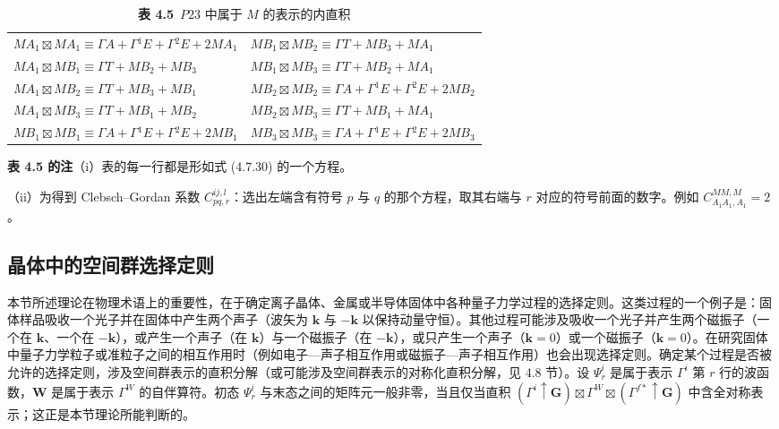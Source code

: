 \begin{table}[H]
\centering
\caption*{\textbf{表 4.5}\ $P23$ 中属于 $M$ 的表示的内直积}
\begin{tabular}{@{}ll@{}}
\toprule
$MA_{1} \boxtimes MA_{1} \equiv \Gamma A + \Gamma{}^{1}E + \Gamma{}^{2}E + 2MA_{1}$ & $MB_{1} \boxtimes MB_{2} \equiv \Gamma T + MB_{3} + MA_{1}$\\
$MA_{1} \boxtimes MB_{1} \equiv \Gamma T + MB_{2} + MB_{3}$ & $MB_{1} \boxtimes MB_{3} \equiv \Gamma T + MB_{2} + MA_{1}$\\
$MA_{1} \boxtimes MB_{2} \equiv \Gamma T + MB_{3} + MB_{1}$ & $MB_{2} \boxtimes MB_{2} \equiv \Gamma A + \Gamma{}^{1}E + \Gamma{}^{2}E + 2MB_{2}$\\
$MA_{1} \boxtimes MB_{3} \equiv \Gamma T + MB_{1} + MB_{2}$ & $MB_{2} \boxtimes MB_{3} \equiv \Gamma T + MB_{1} + MA_{1}$\\
$MB_{1} \boxtimes MB_{1} \equiv \Gamma A + \Gamma{}^{1}E + \Gamma{}^{2}E + 2MB_{1}$ & $MB_{3} \boxtimes MB_{3} \equiv \Gamma A + \Gamma{}^{1}E + \Gamma{}^{2}E + 2MB_{3}$\\
\bottomrule
\end{tabular}
\end{table}

\noindent\textbf{表 4.5 的注}\quad（i）表的每一行都是形如式 (4.7.30) 的一个方程。

（ii）为得到 Clebsch--Gordan 系数 $C^{ij, l}_{pq, r}$：选出左端含有符号 $p$ 与 $q$ 的那个方程，取其右端与 $r$ 对应的符号前面的数字。例如 $C^{MM, M}_{A_{1}A_{1}, A_{1}} = 2$。

\subsection*{晶体中的空间群选择定则}

本节所述理论在物理术语上的重要性，在于确定离子晶体、金属或半导体固体中各种量子力学过程的选择定则。这类过程的一个例子是：固体样品吸收一个光子并在固体中产生两个声子（波矢为 $\mathbf{k}$ 与 $-\mathbf{k}$ 以保持动量守恒）。其他过程可能涉及吸收一个光子并产生两个磁振子（一个在 $\mathbf{k}$、一个在 $-\mathbf{k}$），或产生一个声子（在 $\mathbf{k}$）与一个磁振子（在 $-\mathbf{k}$），或只产生一个声子（$\mathbf{k} = 0$）或一个磁振子（$\mathbf{k} = 0$）。在研究固体中量子力学粒子或准粒子之间的相互作用时（例如电子—声子相互作用或磁振子—声子相互作用）也会出现选择定则。确定某个过程是否被允许的选择定则，涉及空间群表示的直积分解（或可能涉及空间群表示的对称化直积分解，见 4.8 节）。设 $\Psi^{i}_{r}$ 是属于表示 $\Gamma^{i}$ 第 $r$ 行的波函数，$\mathbf{W}$ 是属于表示 $\Gamma^{W}$ 的自伴算符。初态 $\Psi^{i}_{r}$ 与末态之间的矩阵元一般非零，当且仅当直积 $(\Gamma^{i} \uparrow \mathbf{G}) \boxtimes \Gamma^{W} \boxtimes (\Gamma^{f*} \uparrow \mathbf{G})$ 中含全对称表示；这正是本节理论所能判断的。
